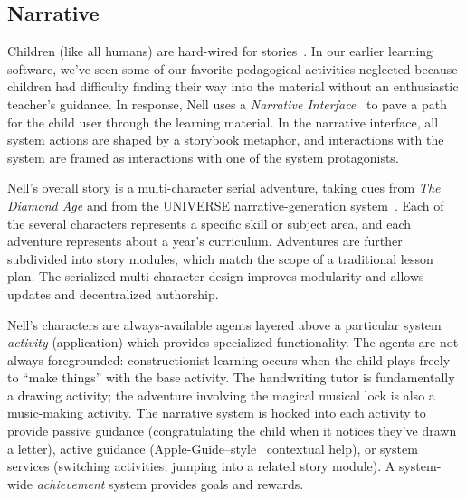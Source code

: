 \documentclass{sig-alternate}
\begin{document}

\subsection{Narrative}

Children (like all humans) are hard-wired for stories~\cite{boyd:stories}.
In our earlier learning software, we've seen some of our favorite
pedagogical activities neglected because children had difficulty
finding their way into the material without an enthusiastic teacher's
guidance.  In response, Nell uses a
\textit{Narrative Interface}~\cite{bizzocchi:narrative,don:narrative}
to pave a path for the child user through the learning material.
In the narrative interface, all system actions are shaped by a
storybook metaphor, and
interactions with the system are framed as interactions with one of the
system protagonists.

Nell's overall story is a multi-character serial adventure, taking
cues from \textit{The Diamond Age} and
from the UNIVERSE narrative-generation system~\cite{lebowitz:universe85}.
Each of the several characters represents a specific skill or subject
area, and each adventure represents about a year's curriculum.
Adventures are further subdivided into story modules, which match the
scope of a traditional lesson plan.  The serialized multi-character
design improves modularity and allows updates and decentralized
authorship.


Nell's characters are
always-available agents layered above a particular system \textit{activity}
(application) which provides specialized functionality.  The agents
are not always foregrounded: constructionist learning occurs when the
child plays freely to ``make things'' with the base activity.
The handwriting tutor is fundamentally a drawing activity; the
adventure involving the magical musical lock is also a music-making activity.
The narrative system is
hooked into each activity to provide passive guidance
(congratulating the child when it notices they've drawn a letter),
active guidance (Apple-Guide--style~\cite{powers:appleguide}
contextual help), or system services (switching activities; jumping into a
related story module).  A system-wide \textit{achievement} system provides
goals and rewards.
\end{document}
